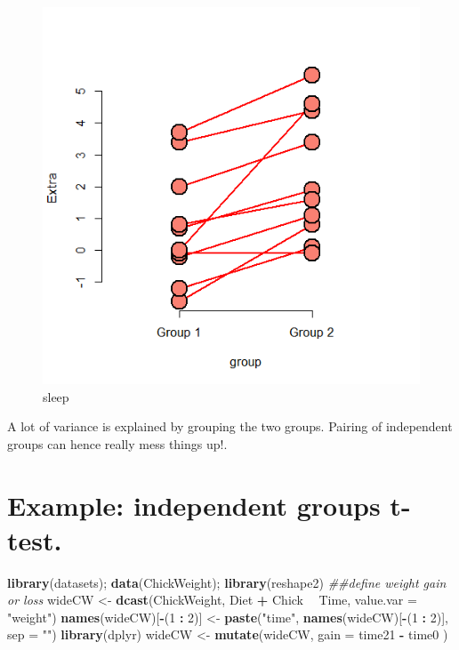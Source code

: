 \documentclass[]{article}
\newenvironment{Shaded}{\begin{snugshade}}{\end{snugshade}}
\newcommand{\CommentTok}[1]{\textcolor[rgb]{0.56,0.35,0.01}{\textit{#1}}}
\newcommand{\DataTypeTok}[1]{\textcolor[rgb]{0.13,0.29,0.53}{#1}}
\newcommand{\DecValTok}[1]{\textcolor[rgb]{0.00,0.00,0.81}{#1}}
\newcommand{\KeywordTok}[1]{\textcolor[rgb]{0.13,0.29,0.53}{\textbf{#1}}}
\newcommand{\NormalTok}[1]{#1}
\newcommand{\OperatorTok}[1]{\textcolor[rgb]{0.81,0.36,0.00}{\textbf{#1}}}
\newcommand{\StringTok}[1]{\textcolor[rgb]{0.31,0.60,0.02}{#1}}
\begin{document}
\begin{figure}
\centering
\includegraphics{sleep.png}
\caption{sleep}
\end{figure}

A lot of variance is explained by grouping the two groups. Pairing of
independent groups can hence really mess things up!.

\hypertarget{example-independent-groups-t-test.}{%
\section{Example: independent groups
t-test.}\label{example-independent-groups-t-test.}}

\begin{Shaded}
\begin{Highlighting}[]
\KeywordTok{library}\NormalTok{(datasets); }\KeywordTok{data}\NormalTok{(ChickWeight); }\KeywordTok{library}\NormalTok{(reshape2)}
\CommentTok{##define weight gain or loss}
\NormalTok{wideCW <-}\StringTok{ }\KeywordTok{dcast}\NormalTok{(ChickWeight, Diet }\OperatorTok{+}\StringTok{ }\NormalTok{Chick }\OperatorTok{~}\StringTok{ }\NormalTok{Time, }\DataTypeTok{value.var =} \StringTok{"weight"}\NormalTok{)}
\KeywordTok{names}\NormalTok{(wideCW)[}\OperatorTok{-}\NormalTok{(}\DecValTok{1} \OperatorTok{:}\StringTok{ }\DecValTok{2}\NormalTok{)] <-}\StringTok{ }\KeywordTok{paste}\NormalTok{(}\StringTok{"time"}\NormalTok{, }\KeywordTok{names}\NormalTok{(wideCW)[}\OperatorTok{-}\NormalTok{(}\DecValTok{1} \OperatorTok{:}\StringTok{ }\DecValTok{2}\NormalTok{)], }\DataTypeTok{sep =} \StringTok{""}\NormalTok{)}
\KeywordTok{library}\NormalTok{(dplyr)}
\NormalTok{wideCW <-}\StringTok{ }\KeywordTok{mutate}\NormalTok{(wideCW,}
  \DataTypeTok{gain =}\NormalTok{ time21 }\OperatorTok{-}\StringTok{ }\NormalTok{time0}
\NormalTok{)}
\end{Highlighting}
\end{Shaded}
\end{document}
